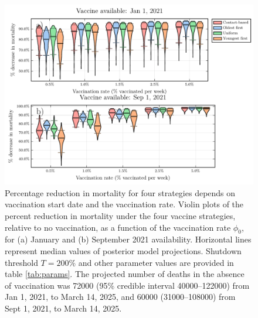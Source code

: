 \begin{figure}
  \includegraphics[width=\textwidth]{chapter_1/vaccination_by_mortality_small.pdf}  
  \caption{Percentage reduction in mortality for four strategies depends on vaccination start date and the vaccination rate.  Violin plots of the percent reduction in mortality under the four vaccine strategies, relative to no vaccination, as a function of the vaccination rate $\phi_0$, for (a) January and (b) September 2021 availability. Horizontal lines represent median values of posterior model projections. Shutdown threshold $T = 200\%$ and other parameter values are provided in table \ref{tab:params}. The projected number of deaths in the absence of vaccination was 72000 (95\% credible interval 40000–122000) from Jan 1, 2021, to March 14, 2025, and 60000 (31000–108000) from Sept 1, 2021, to March 14, 2025.}
  \label{fig4}
\end{figure}
